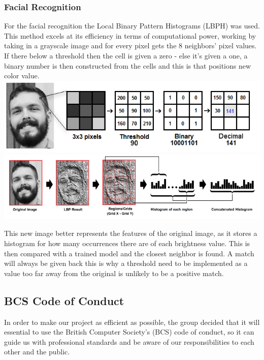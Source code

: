 \documentclass[
  english,
  a4paper,
,tablecaptionabove
]{scrartcl}
\begin{document}
\hypertarget{facial-recognition}{%
\subsubsection{Facial Recognition}\label{facial-recognition}}

For the facial recognition the Local Binary Pattern Histograms (LBPH)
was used. This method excels at its efficiency in terms of computational
power, working by taking in a grayscale image and for every pixel gets
the 8 neighbors' pixel values. If there below a threshold then the cell
is given a zero - else it's given a one, a binary number is then
constructed from the cells and this is that positions new color value.
\includegraphics{images/ppm-images/camera-algorithm3.png}
\includegraphics{images/ppm-images/camera-algorithm4.png}

This new image better represents the features of the original image, as
it stores a histogram for how many occurrences there are of each
brightness value. This is then compared with a trained model and the
closest neighbor is found. A match will always be given back this is why
a threshold need to be implemented as a value too far away from the
original is unlikely to be a positive match.

\newpage

\hypertarget{bcs-code-of-conduct}{%
\subsection{BCS Code of Conduct}\label{bcs-code-of-conduct}}

In order to make our project as efficient as possible, the group decided
that it will essential to use the British Computer Society's (BCS) code
of conduct, so it can guide us with professional standards and be aware
of our responsibilities to each other and the public.
\end{document}
